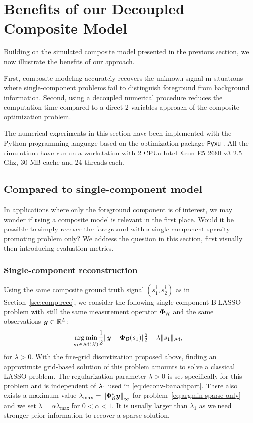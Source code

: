 \documentclass[12pt]{article}
\begin{document}
\section{Benefits of our Decoupled Composite Model}
    
    Building on the simulated composite model presented in the previous section, we now illustrate the benefits of our approach.
    
    First, composite modeling accurately recovers the unknown signal in situations where single-component problems fail to distinguish foreground from background information. Second, using a decoupled numerical procedure reduces the computation time compared to a direct 2-variables approach of the composite optimization problem.

    The numerical experiments in this section have been implemented with the Python programming language based on the optimization package \texttt{Pyxu} \cite{pyxu-framework}. All the simulations have run on a workstation with 2 CPUs Intel Xeon E5-2680 v3 \@2.5 Ghz, 30 MB cache and 24 threads each. 

    \subsection{Compared to single-component model}
    \label{sec:bene:comp}
        In applications where only the foreground component is of interest, we may wonder if using a composite model is relevant in the first place. Would it be possible to simply recover the foreground with a single-component sparsity-promoting problem only? We address the question in this section, first visually then introducing evaluation metrics.

        \subsubsection{Single-component reconstruction}
        Using the same composite ground truth signal $(s_1^\dagger, s_2^\dagger)$ as in Section~\ref{sec:comp:reco}, we consider the following single-component B-LASSO problem with still the same measurement operator $\bm{\Phi}_\mathcal{H}$ and the same observations $\bm{y}\in\mathbb{R}^L$:
        \begin{equation}
            \label{eq:argmin-sparse-only}
            \underset{s_1 \in {\mathcal{M}}({\mathcal{X}})}{\arg\min} \frac{1}{2} \| \bm{y} - \bm{\Phi}_\mathcal{B} (s_1) \|_2^2  + \lambda \| s_1 \|_{\mathcal{M}},
        \end{equation}
        for $\lambda > 0$.
        With the fine-grid discretization proposed above, finding an approximate grid-based solution of this problem amounts to solve a classical LASSO problem. The regularization parameter $\lambda > 0$ is set specifically for this problem and is independent of $\lambda_{1}$ used in \eqref{eq:deconv-banachpart}. There also exists a maximum value $\lambda_\mathrm{max} = \left\lVert\bm{\Phi}_\mathcal{B}^*\bm{y}\right\rVert_\infty$ for problem~\eqref{eq:argmin-sparse-only} and we set $\lambda = \alpha \lambda_\mathrm{max}$ for $0 < \alpha < 1$. It is usually larger than $\lambda_1$ as we need stronger prior information to recover a sparse solution.
        
\end{document}
